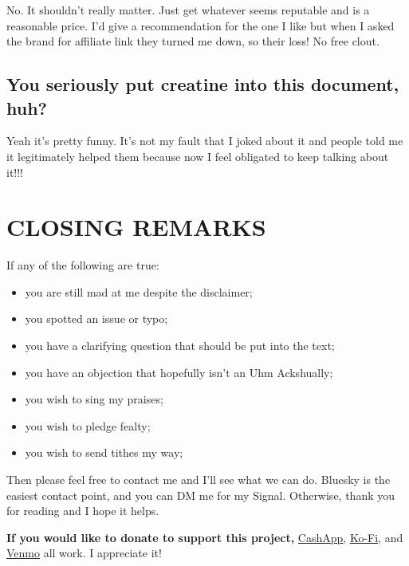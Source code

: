 \documentclass{article}
\begin{document}
No. It shouldn’t really matter. Just get whatever seems reputable and is a reasonable price. I’d give a recommendation for the one I like but when I asked the brand for affiliate link they turned me down, so their loss! No free clout.

\subsection{You seriously put creatine into this document, huh?}

Yeah it’s pretty funny. It’s not my fault that I joked about it and people told me it legitimately helped them because now I feel obligated to keep talking about it!!!

 

\section{CLOSING REMARKS}

If any of the following are true:

\begin{itemize}
\item you are still mad at me despite the disclaimer;

\item you spotted an issue or typo;

\item you have a clarifying question that should be put into the text;

\item you have an objection that hopefully isn’t an Uhm Ackshually;

\item you wish to sing my praises;

\item you wish to pledge fealty; 

\item you wish to send tithes my way;
\end{itemize}

Then please feel free to contact me and I’ll see what we can do. Bluesky is the easiest contact point, and you can DM me for my Signal. Otherwise, thank you for reading and I hope it helps.

\textbf{If you would like to donate to support this project,} \href{https://cash.app/Katitties}{CashApp}, \href{https://ko-fi.com/katitties}{Ko-Fi}, and \href{https://account.venmo.com/u/katitties}{Venmo} all work. I appreciate it!
\end{document}

